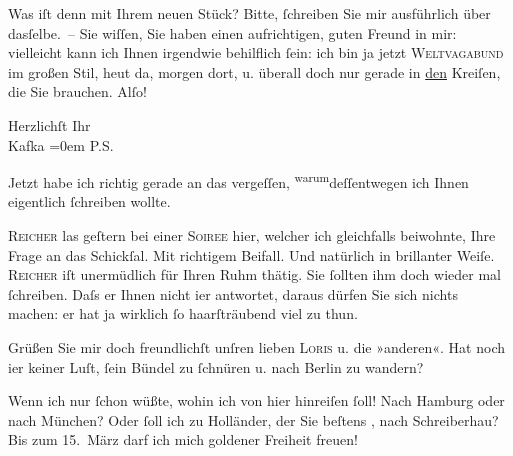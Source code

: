 \pstart
           Was iſt denn mit Ihrem neuen Stück? Bitte, ſchreiben Sie mir ausführlich über
               dasſelbe. – Sie wiſſen, Sie haben einen aufrichtigen, guten Freund in mir: vielleicht
               kann ich Ihnen irgendwie behilflich ſein: ich bin ja jetzt \textsc{Weltvagabund} im großen Stil, heut da, morgen dort, u. überall doch nur
               gerade in \uline{den} Kreiſen, die Sie brauchen. Alſo!\pend
           
\pstart
           Herzlichſt Ihr{\\[\baselineskip]}\spacefill\mbox{Kafka}\pend
           \leftskip=0em{}
\pstart
           \noindent{}{\pb}\textsc{P.S.}\pend
           
\pstart
           Jetzt habe ich richtig gerade an das vergeſſen, \substVorne{}\textsuperscript{warum}\substDazwischen{}deſſentwegen\substHinten{} ich Ihnen eigentlich ſchreiben wollte.\pend
           
\pstart
           \textsc{Reicher} las geſtern bei einer \textsc{Soiree} hier, welcher ich
                  gleichfalls beiwohnte, Ihre Frage an das
                     Schickſal. Mit richtigem Beifall. Und natürlich in brillanter Weiſe. \textsc{Reicher} iſt unermüdlich für Ihren Ruhm thätig. Sie ſollten ihm doch wieder mal
                  ſchreiben. {\pb}Daſs er Ihnen nicht i{\geminationm}er antwortet, daraus dürfen Sie sich nichts machen:
                  er hat ja wirklich ſo haarſträubend viel zu thun.\pend
           
\pstart
           Grüßen Sie mir doch freundlichſt unſren lieben \textsc{Loris} u. die »anderen«. Hat noch i{\geminationm}er keiner Luſt,
                  ſein Bündel zu ſchnüren u. nach Berlin zu
                  wandern?\pend
           
\pstart
           Wenn ich nur ſchon wüßte, wohin ich von hier hinreiſen ſoll! Nach Hamburg oder nach München? Oder ſoll ich zu Holländer, der Sie beſtens \label{T_L00182-2v}\label{T_L00182-2}, nach Schreiberhau? Bis zum
                     15. März darf ich mich goldener Freiheit freuen!\pend
           

